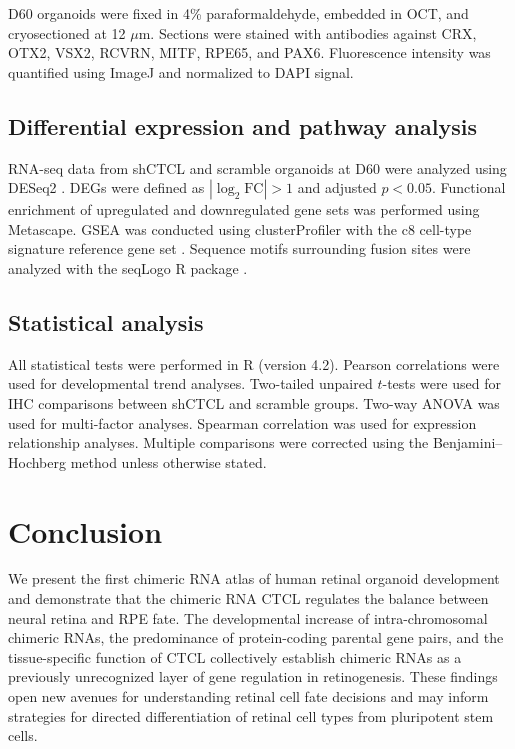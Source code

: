 \documentclass[11pt]{article}
\begin{document}
D60 organoids were fixed in 4\% paraformaldehyde, embedded in OCT, and cryosectioned at 12 $\mu$m. Sections were stained with antibodies against CRX, OTX2, VSX2, RCVRN, MITF, RPE65, and PAX6. Fluorescence intensity was quantified using ImageJ and normalized to DAPI signal.

\subsection{Differential expression and pathway analysis}

RNA-seq data from shCTCL and scramble organoids at D60 were analyzed using DESeq2 \citep{love2014deseq2}. DEGs were defined as $|\log_{2}\text{FC}| > 1$ and adjusted $p < 0.05$. Functional enrichment of upregulated and downregulated gene sets was performed using Metascape. GSEA was conducted using clusterProfiler \citep{wu2021clusterprofiler} with the c8 cell-type signature reference gene set \citep{subramanian2005gsea}. Sequence motifs surrounding fusion sites were analyzed with the seqLogo R package \citep{schneider2010seqlogo}.

\subsection{Statistical analysis}

All statistical tests were performed in R (version 4.2). Pearson correlations were used for developmental trend analyses. Two-tailed unpaired $t$-tests were used for IHC comparisons between shCTCL and scramble groups. Two-way ANOVA was used for multi-factor analyses. Spearman correlation was used for expression relationship analyses. Multiple comparisons were corrected using the Benjamini--Hochberg method unless otherwise stated.

\section{Conclusion}

We present the first chimeric RNA atlas of human retinal organoid development and demonstrate that the chimeric RNA CTCL regulates the balance between neural retina and RPE fate. The developmental increase of intra-chromosomal chimeric RNAs, the predominance of protein-coding parental gene pairs, and the tissue-specific function of CTCL collectively establish chimeric RNAs as a previously unrecognized layer of gene regulation in retinogenesis. These findings open new avenues for understanding retinal cell fate decisions and may inform strategies for directed differentiation of retinal cell types from pluripotent stem cells.



\end{document}
